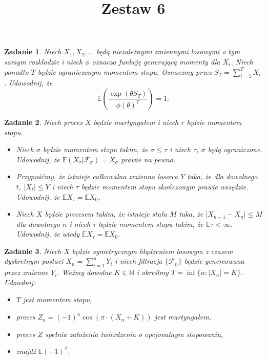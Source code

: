 \documentclass{mwart}
\title{Zestaw 6}
\newtheorem{zd}{Zadanie}
\begin{document}

\maketitle


\begin{zd}
Niech $X_1, X_2, \dots$ będą niezależnymi zmiennymi losowymi o tym samym rozkładzie i niech $\phi$ oznacza funkcję generującą momenty dla $X_i$. Niech ponadto $T$ będzie ograniczonym momentem stopu. Oznaczmy przez $S_T=\sum_{i=1}^TX_i$. Udowodnij, że
\begin{displaymath}
\mathbb{E}\left(\frac{\exp{(\theta S_T)}}{\phi(\theta)^T}\right)=1.
\end{displaymath}
\end{zd}

\begin{zd}
Niech proces $X$ będzie martyngałem i niech $\tau$ będzie momentem stopu.
\begin{itemize}
\item Niech $\sigma$ będzie momentem stopu takim, że $\sigma \leq \tau$ i niech $\tau,\ \sigma$ będą ograniczone. Udowodnij, że $\mathbb{E}\left(X_{\tau}|\mathcal{F}_{\sigma}\right) = X_{\sigma}$ prawie na pewno.
\item Przypuśćmy, że istnieje całkowalna zmienna losowa $Y$ taka, że dla dowolnego $t$, $|X_t| \leq Y$ i niech $\tau$ będzie momentem stopu skończonym prawie wszędzie. Udowodnij, że $\mathbb{E}X_{\tau} = \mathbb{E}X_0 $.
\item Niech $X$ będzie procesem takim, że istnieje stała $M$ taka, że $|X_{n-1} - X_n| \leq M$ dla dowolnego $n$ i niech $\tau$ będzie momentem stopu takim, że $\mathbb{E}\tau < \infty$. Udowodnij, że wtedy $\mathbb{E}X_{\tau} = \mathbb{E}X_0$.
\end{itemize}
\end{zd}


\begin{zd}
Niech $X$ będzie symetrycznym błądzeniem losowym z czasem dyskretnym postaci $X_n = \sum_{i=1}^nY_i$ i niech filtracja $\{\mathcal{F}_n\}$ będzie genereowana przez zmienne $Y_i$. Weźmy dowolne $K\in \mathbb{N}$ i określmy $T = \inf\{n\colon |X_n|=K\}$. Udowdnij:
\begin{itemize}
\item $T$ jest momentem stopu,
\item proces $Z_n = (-1)^n\cos\left(\pi\cdot (X_n+K)\right)$ jest martyngałem,
\item proces $Z$ spełnia założenia twierdzenia o opcjonalnym stopowaniu,
\item znajdź $\mathbb{E}(-1)^T$.
\end{itemize}
\end{zd}
\end{document}
